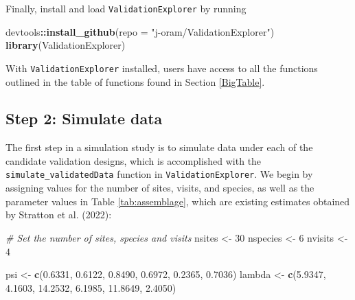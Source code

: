 \documentclass[
]{article}
\newenvironment{Shaded}{\begin{snugshade}}{\end{snugshade}}
\newcommand{\AttributeTok}[1]{\textcolor[rgb]{0.13,0.29,0.53}{#1}}
\newcommand{\CommentTok}[1]{\textcolor[rgb]{0.56,0.35,0.01}{\textit{#1}}}
\newcommand{\DecValTok}[1]{\textcolor[rgb]{0.00,0.00,0.81}{#1}}
\newcommand{\FloatTok}[1]{\textcolor[rgb]{0.00,0.00,0.81}{#1}}
\newcommand{\FunctionTok}[1]{\textcolor[rgb]{0.13,0.29,0.53}{\textbf{#1}}}
\newcommand{\NormalTok}[1]{#1}
\newcommand{\OtherTok}[1]{\textcolor[rgb]{0.56,0.35,0.01}{#1}}
\newcommand{\SpecialCharTok}[1]{\textcolor[rgb]{0.81,0.36,0.00}{\textbf{#1}}}
\newcommand{\StringTok}[1]{\textcolor[rgb]{0.31,0.60,0.02}{#1}}
\begin{document}
\linespread{1}

Finally, install and load \texttt{ValidationExplorer} by running

\linespread{1}

\begin{Shaded}
\begin{Highlighting}[]
\NormalTok{devtools}\SpecialCharTok{::}\FunctionTok{install\_github}\NormalTok{(}\AttributeTok{repo =} \StringTok{"j{-}oram/ValidationExplorer"}\NormalTok{)}
\FunctionTok{library}\NormalTok{(ValidationExplorer)}
\end{Highlighting}
\end{Shaded}

\linespread{1}

With \texttt{ValidationExplorer} installed, users have access to all the functions outlined in the table of functions found in Section \ref{BigTable}.

\subsection{\texorpdfstring{Step 2: Simulate data \label{dataSimulation}}{Step 2: Simulate data }}\label{step-2-simulate-data}

The first step in a simulation study is to simulate data under each of the candidate validation designs, which is accomplished with the \texttt{simulate\_validatedData} function in \texttt{ValidationExplorer}. We begin by assigning values for the number of sites, visits, and species, as well as the parameter values in Table \ref{tab:assemblage}, which are existing estimates obtained by Stratton et al. (2022):

\linespread{1}

\begin{Shaded}
\begin{Highlighting}[]
\CommentTok{\# Set the number of sites, species and visits}
\NormalTok{nsites }\OtherTok{\textless{}{-}} \DecValTok{30}
\NormalTok{nspecies }\OtherTok{\textless{}{-}} \DecValTok{6}
\NormalTok{nvisits }\OtherTok{\textless{}{-}} \DecValTok{4}

\NormalTok{psi }\OtherTok{\textless{}{-}} \FunctionTok{c}\NormalTok{(}\FloatTok{0.6331}\NormalTok{, }\FloatTok{0.6122}\NormalTok{, }\FloatTok{0.8490}\NormalTok{, }\FloatTok{0.6972}\NormalTok{, }\FloatTok{0.2365}\NormalTok{, }\FloatTok{0.7036}\NormalTok{)}
\NormalTok{lambda }\OtherTok{\textless{}{-}} \FunctionTok{c}\NormalTok{(}\FloatTok{5.9347}\NormalTok{, }\FloatTok{4.1603}\NormalTok{, }\FloatTok{14.2532}\NormalTok{, }\FloatTok{6.1985}\NormalTok{, }\FloatTok{11.8649}\NormalTok{, }\FloatTok{2.4050}\NormalTok{)}
\end{Highlighting}
\end{Shaded}
\end{document}
